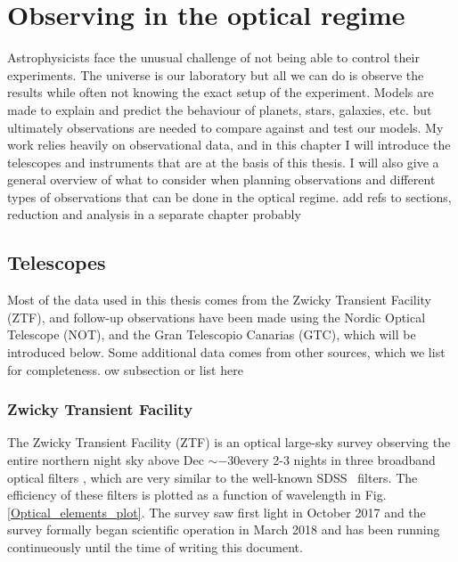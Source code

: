 \documentclass[a4paper,oneside,12pt, class=Latex/Classes/PhDthesisPSnPDF, crop=false]{standalone}
\begin{document}
\doublespacing
\chapter{Observing in the optical regime}
\label{chap:obs}

Astrophysicists face the unusual challenge of not being able to control their experiments. The universe is our laboratory but all we can do is observe the results while often not knowing the exact setup of the experiment. Models are made to explain and predict the behaviour of planets, stars, galaxies, etc. but ultimately observations are needed to compare against and test our models. My work relies heavily on observational data, and in this chapter I will introduce the telescopes and instruments that are at the basis of this thesis. I will also give a general overview of what to consider when planning observations and different types of observations that can be done in the optical regime. \color{red}add refs to sections, reduction and analysis in a separate chapter probably \color{black}


\section{Telescopes}
Most of the data used in this thesis comes from the Zwicky Transient Facility (ZTF), and follow-up observations have been made using the Nordic Optical Telescope (NOT), and the Gran Telescopio Canarias (GTC), which will be introduced below. Some additional data comes from other sources, which we list for completeness. \color{red}ow subsection or list here \color{black}

\subsection{Zwicky Transient Facility}
The Zwicky Transient Facility (ZTF) is an optical large-sky survey observing the entire northern night sky above Dec $\sim-30$\degree every 2-3 nights in three broadband optical filters \ztfg\ztfr\ztfi, which are very similar to the well-known SDSS \ztfg\ztfr\ztfi\ filters. The efficiency of these filters is plotted as a function of wavelength in Fig.\ref{Optical_elements_plot}. The survey saw first light in October 2017 and the survey formally began scientific operation in March 2018 and has been running continueously until the time of writing this document.
\end{document}
